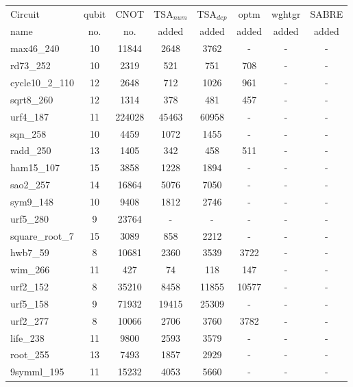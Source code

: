 \documentclass[journal]{IEEEtran}
\begin{document}
        \begin{table*}[htbp]
            \begin{center}  
            \begin{tabular}{|p{4.3cm}<{\centering}|c|c|c|c|c|c|c|}
            \hline
            Circuit &  qubit  & CNOT &TSA$_{num}$& TSA$_{dep}$  & optm 	 & wghtgr  &SABRE 	\\
             name	&   no. 	&	no. & added&  added &  added 	&  added&  added\\
            \hline
            max46\_240 & 10 & 11844 & 2648 & 3762 & - & - & - \\ 
            rd73\_252 & 10 & 2319 & 521 & 751 & 708 & - & - \\ 
            cycle10\_2\_110 & 12 & 2648 & 712 & 1026 & 961 & - & - \\ 
            sqrt8\_260 & 12 & 1314 & 378 & 481 & 457 & - & - \\ 
            urf4\_187 & 11 & 224028 & 45463 & 60958 & - & - & - \\ 
            sqn\_258 & 10 & 4459 & 1072 & 1455 & - & - & - \\ 
            radd\_250 & 13 & 1405 & 342 & 458 & 511 & - & - \\ 
            ham15\_107 & 15 & 3858 & 1228 & 1894 & - & - & - \\ 
            sao2\_257 & 14 & 16864 & 5076 & 7050 & - & - & - \\ 
            sym9\_148 & 10 & 9408 & 1812 & 2746 & - & - & - \\ 
            urf5\_280 & 9 & 23764 & - & - & - & - & - \\ 
            square\_root\_7 & 15 & 3089 & 858 & 2212 & - & - & - \\ 
            hwb7\_59 & 8 & 10681 & 2360 & 3539 & 3722 & - & - \\ 
            wim\_266 & 11 & 427 & 74 & 118 & 147 & - & - \\ 
            urf2\_152 & 8 & 35210 & 8458 & 11855 & 10577 & - & - \\ 
            urf5\_158 & 9 & 71932 & 19415 & 25309 & - & - & - \\ 
            urf2\_277 & 8 & 10066 & 2706 & 3760 & 3782 & - & - \\ 
            life\_238 & 11 & 9800 & 2593 & 3579 & - & - & - \\ 
            root\_255 & 13 & 7493 & 1857 & 2929 & - & - & - \\ 
            9symml\_195 & 11 & 15232 & 4053 & 5660 & - & - & - \\ 

\end{tabular}
\end{center}
\end{table*}
\end{document}
